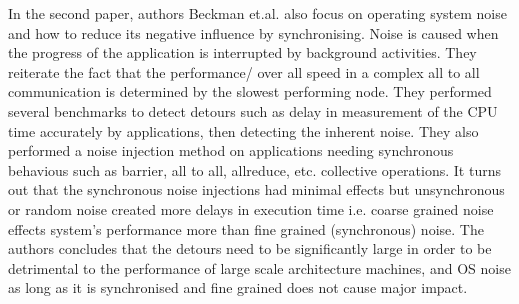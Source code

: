 \documentclass[a4paper,12 pt]{article}
\begin{document}
In the second paper, authors Beckman et.al. also focus on operating system noise and how to reduce its negative influence by synchronising. Noise is caused when the progress of the application is interrupted by background activities. They reiterate the fact that the performance/ over all speed in a complex all to all communication is determined by the slowest performing node. They performed several benchmarks to detect detours such as delay in measurement of the CPU time accurately by applications, then detecting the inherent noise. They also performed a noise injection method on applications needing synchronous behavious such as barrier, all to all, allreduce, etc. collective operations. It turns out that the synchronous noise injections had minimal effects but unsynchronous or random noise created more delays in execution time i.e. coarse grained noise effects system's performance more than fine grained (synchronous) noise. The authors concludes that the detours need to be significantly large in order to be detrimental to the performance of large scale architecture machines, and OS noise as long as it is synchronised and fine grained does not cause major impact.
\end{document}

